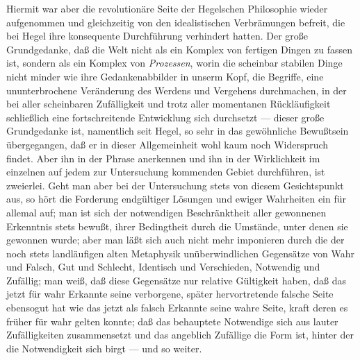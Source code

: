Hiermit war aber die revolutionäre Seite der Hegelschen
Philosophie wieder aufgenommen und gleichzeitig von den idealistischen
Verbrämungen befreit, die bei Hegel ihre konsequente Durchführung
verhindert hatten. Der große Grundgedanke, daß die Welt nicht als ein
Komplex von fertigen Dingen zu fassen ist, sondern als ein Komplex
von \emph{Prozessen}, worin die scheinbar stabilen Dinge nicht minder
wie ihre Gedankenabbilder in unserm Kopf, die Begriffe, eine
ununterbrochene Veränderung des Werdens und Vergehens durchmachen, in
der bei aller scheinbaren Zufälligkeit und trotz aller momentanen
Rückläufigkeit schließlich eine fortschreitende Entwicklung sich
durchsetzt --- dieser große Grundgedanke ist, namentlich seit Hegel, so
sehr in das gewöhnliche Bewußtsein übergegangen, daß er in dieser
Allgemeinheit wohl kaum noch Widerspruch findet. Aber ihn in der Phrase
anerkennen und ihn in der Wirklichkeit im einzelnen auf jedem zur
Untersuchung kommenden Gebiet durchführen, ist zweierlei. Geht man aber
bei der Untersuchung stets von diesem Gesichtspunkt aus, so hört die
Forderung endgültiger Lösungen und ewiger Wahrheiten ein für allemal
auf; man ist sich der notwendigen Beschränktheit aller gewonnenen
Erkenntnis stets bewußt, ihrer Bedingtheit durch die Umstände, unter
denen sie gewonnen wurde; aber man läßt sich auch nicht mehr imponieren
durch die der noch stets landläufigen alten Metaphysik unüberwindlichen
Gegensätze von Wahr und Falsch,
Gut und Schlecht, Identisch und Verschieden, Notwendig und Zufällig; man
weiß, daß diese Gegensätze nur relative Gültigkeit haben, daß das jetzt
für wahr Erkannte seine verborgene, später hervortretende falsche Seite
ebensogut hat wie das jetzt als falsch Erkannte seine wahre Seite, kraft
deren es früher für wahr gelten konnte; daß das behauptete Notwendige
sich aus lauter Zufälligkeiten zusammensetzt und das angeblich Zufällige
die Form ist, hinter der die Notwendigkeit sich birgt --- und so weiter.


